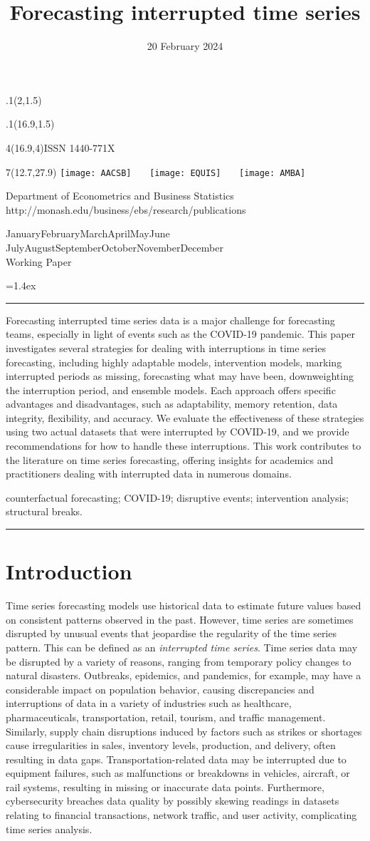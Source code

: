 \documentclass[
  11pt,
  a4paper,
]{article}
\title{Forecasting interrupted time series}
\date{20 February 2024}
\makeatletter
\def\placefig#1#2#3#4{\begin{textblock}{.1}(#1,#2)\rlap{\texttt{[image: \#4]}}\end{textblock}}
\def\Date{\number\day}
\def\Month{\ifcase\month\or
 January\or February\or March\or April\or May\or June\or
 July\or August\or September\or October\or November\or December\fi}
\def\Year{\number\year}
\def\showjel{{\large\textsf{\textbf{JEL classification:}}~\@jel}}
\def\cover{{\sffamily\setcounter{page}{0}
        \thispagestyle{empty}
        \placefig{2}{1.5}{width=5cm}{monash2}
        \placefig{16.9}{1.5}{width=2.1cm}{MBSportrait}
        \begin{textblock}{4}(16.9,4)ISSN 1440-771X\end{textblock}
        \begin{textblock}{7}(12.7,27.9)\hfill
        \texttt{[image: AACSB]}~~~
        \texttt{[image: EQUIS]}~~~
        \texttt{[image: AMBA]}
        \end{textblock}
        \vspace*{2.5cm}
        \begin{center}\Large
        Department of Econometrics and Business Statistics\\[.5cm]
        \footnotesize http://monash.edu/business/ebs/research/publications
        \end{center}\vspace{2cm}
        \begin{center}
        \fbox{\parbox{14cm}{\begin{onehalfspace}\centering\Huge\vspace*{0.3cm}
                \textsf{\textbf{\expandafter{\@title}}}\vspace{1cm}\par
                \LARGE
                \expandafter{\@author}
                \end{onehalfspace}
        }}
        \end{center}
        \vfill
                \begin{center}\Large
                \Month~\Year\\[1cm]
                Working Paper \@wp
        \end{center}\vspace*{2cm}}}
\def\pageone{{\sffamily\setstretch{1}%
        \thispagestyle{empty}%
        \vbox to \textheight{%
        \raggedright\baselineskip=1.2cm
     {\fontsize{24.88}{30}\sffamily\textbf{\expandafter{\@title}}}
        \vspace{2cm}\par
        \hspace{1cm}\parbox{14cm}{\sffamily\large\@addresses}\vspace{1cm}\vfill
        \hspace{1cm}{\large\Date~\Month~\Year}\\[1cm]
        \hspace{1cm}\showjel\vss}}}
\def\blindtitle{{\sffamily
     \thispagestyle{plain}\raggedright\baselineskip=1.2cm
     {\fontsize{24.88}{30}\sffamily\textbf{\expandafter{\@title}}}\vspace{1cm}\par
        }}
\def\titlepage{{\cover\newpage\pageone\newpage\blindtitle}}
\let\maketitle\titlepage
\newenvironment{keywords}{\par\vspace{0.5cm}\noindent{\sffamily\textbf{Keywords:}}}{\vspace{0.25cm}\par\hrule\vspace{0.5cm}\par}
\renewenvironment{abstract}{\begin{minipage}{\textwidth}\parskip=1.4ex\noindent
\hrule\vspace{0.1cm}\par{\sffamily\textbf{\abstractname}}\newline\setstretch{1.5}}
  {\end{minipage}}
\makeatother
\begin{document}
\maketitle

\begin{abstract}
Forecasting interrupted time series data is a major challenge for
forecasting teams, especially in light of events such as the COVID-19
pandemic. This paper investigates several strategies for dealing with
interruptions in time series forecasting, including highly adaptable
models, intervention models, marking interrupted periods as missing,
forecasting what may have been, downweighting the interruption period,
and ensemble models. Each approach offers specific advantages and
disadvantages, such as adaptability, memory retention, data integrity,
flexibility, and accuracy. We evaluate the effectiveness of these
strategies using two actual datasets that were interrupted by COVID-19,
and we provide recommendations for how to handle these interruptions.
This work contributes to the literature on time series forecasting,
offering insights for academics and practitioners dealing with
interrupted data in numerous domains.
\end{abstract}

\begin{keywords}
  counterfactual forecasting; COVID-19; disruptive events; intervention
analysis; 
  structural breaks.
\end{keywords}

\section{Introduction}\label{sec-introduction}

Time series forecasting models use historical data to estimate future
values \autocite{fildes2008forecasting} based on consistent patterns
observed in the past. However, time series are sometimes disrupted by
unusual events that jeopardise the regularity of the time series
pattern. This can be defined as an \emph{interrupted time series}. Time
series data may be disrupted by a variety of reasons, ranging from
temporary policy changes to natural disasters. Outbreaks, epidemics, and
pandemics, for example, may have a considerable impact on population
behavior, causing discrepancies and interruptions of data in a variety
of industries such as healthcare, pharmaceuticals, transportation,
retail, tourism, and traffic management. Similarly, supply chain
disruptions induced by factors such as strikes or shortages cause
irregularities in sales, inventory levels, production, and delivery,
often resulting in data gaps. Transportation-related data may be
interrupted due to equipment failures, such as malfunctions or
breakdowns in vehicles, aircraft, or rail systems, resulting in missing
or inaccurate data points. Furthermore, cybersecurity breaches data
quality by possibly skewing readings in datasets relating to financial
transactions, network traffic, and user activity, complicating time
series analysis.
\end{document}
